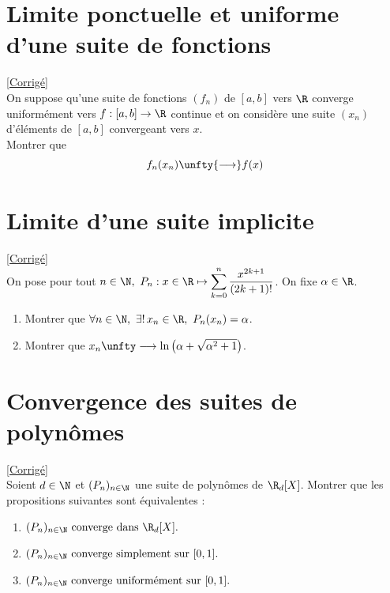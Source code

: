 \documentclass{book}
\begin{document}
	\section{Limite ponctuelle et uniforme d'une suite de fonctions}
	\textcolor{blue}{\hyperref[sec:limite-ponctuelle-et-uniforme-dune-suite-de-fonctions]{[Corrigé]}}\\
	\label{Limite ponctuelle et uniforme d'une suite de fonctions}
	On suppose qu'une suite de fonctions $(f_n)$ de $[a,b]$ vers $\R$ converge uniformément vers $f:[a,b]\to\R$ continue et on considère une suite $(x_n)$ d'éléments de $[a,b]$ convergeant vers $x$.
	\\ Montrer que $$f_n(x_n)\unfty{\longrightarrow} f(x)$$
	
	\section{Limite d'une suite implicite }
	\textcolor{blue}{\hyperref[Limite d'une suite implicite Corrigé]{[Corrigé]}}\\
	\label{Limite d'une suite implicite}
	On pose pour tout $n\in \N,\ P_n:x\in \R\mapsto\displaystyle\sum_{k=0}^n\frac{x^{2k+1}}{(2k+1)!}$. On fixe $\alpha\in \R$.
	\begin{enumerate}
		\item Montrer que $\forall n\in \N,\ \exists!\, x_n\in \R,\ P_n(x_n)=\alpha$.
		\item Montrer que $x_n\unfty\longrightarrow \ln\left(\alpha+\sqrt{\alpha^2+1}\right)$.
	\end{enumerate}
	
	\section{Convergence des suites de polynômes }
	\textcolor{blue}{\hyperref[Convergence des suites de polynômes Corrigé]{[Corrigé]}}\\
	\label{Convergence des suites de polynômes}
	Soient $d\in\N$ et $(P_n)_{n\in \N}$ une suite de polynômes de $\R_d[X]$. Montrer que les propositions suivantes sont équivalentes :
	\begin{enumerate}[label=(\roman*)]
		\item $(P_n)_{n\in \N} \ \text{converge dans} \ \R_d[X].$
		\item $(P_n)_{n\in \N} \ \text{converge simplement sur}\ [0,1].$
		\item $(P_n)_{n\in \N} \ \text{converge uniformément sur}\ [0,1].$
	\end{enumerate}
	
\end{document}
